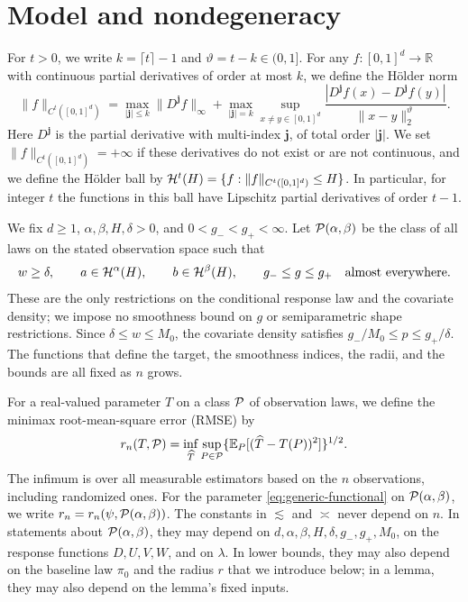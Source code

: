 \section{Model and nondegeneracy}\label{sec:exactclass}

For $t>0$, we write $k=\lceil t\rceil-1$ and $\vartheta=t-k\in(0,1]$.
For any $f:[0,1]^d\to\mathbb R$ with continuous partial derivatives
of order at most $k$, we define the H\"older norm
\[
 \|f\|_{C^t([0,1]^d)}
 =\max_{|\mathbf j|\le k}\|D^{\mathbf j} f\|_\infty
 +\max_{|\mathbf j|=k}\sup_{x\ne y\in[0,1]^d}
 \frac{|D^{\mathbf j} f(x)-D^{\mathbf j} f(y)|}{\|x-y\|_2^\vartheta}.
\]
Here $D^{\mathbf j}$ is the partial derivative with multi-index
$\mathbf j$, of total order $|\mathbf j|$.
We set $\|f\|_{C^t([0,1]^d)}=+\infty$ if these derivatives do not
exist or are not continuous, and we define the H\"older ball by
$\mathcal H^t(H)=\{f:\|f\|_{C^t([0,1]^d)}\le H\}$.
In particular, for integer $t$ the functions in this ball have Lipschitz
partial derivatives of order $t-1$.

We fix $d\ge1$, $\alpha,\beta,H,\delta>0$, and $0<g_-<g_+<\infty$.
Let $\mathcal P(\alpha,\beta)$ be the class of all laws on the stated
observation space such that
\begin{equation}\label{eq:generic-class}
 w\ge\delta,\qquad
 a\in\mathcal H^\alpha(H),\qquad b\in\mathcal H^\beta(H),\qquad
 g_-\le g\le g_+\quad\text{almost everywhere}.
\end{equation}
These are the only restrictions on the conditional response law
and the covariate density; we impose no smoothness bound on $g$ or
semiparametric shape restrictions. Since $\delta\le w\le M_0$, the covariate density
satisfies $g_-/M_0\le p\le g_+/\delta$. The functions that define the
target, the smoothness indices, the radii, and the bounds are all fixed
as $n$ grows.

For a real-valued parameter $T$ on a class $\mathcal P$ of observation laws,
we define the minimax root-mean-square error (RMSE) by
\[
 r_n(T,\mathcal P)=\inf_{\widehat T}\sup_{P\in\mathcal P}
 \{\mathbb E_P[(\widehat T-T(P))^2]\}^{1/2}.
\]
The infimum is over all measurable estimators based on the $n$
observations, including randomized ones.
For the parameter \eqref{eq:generic-functional} on
$\mathcal P(\alpha,\beta)$, we write $r_n=r_n(\psi,\mathcal P(\alpha,\beta))$.
The constants in $\lesssim$ and $\asymp$ never depend on $n$. In
statements about $\mathcal P(\alpha,\beta)$, they may depend on
$d,\alpha,\beta,H,\delta,g_-,g_+,M_0$, on the response functions
$D,U,V,W$, and on $\lambda$. In lower bounds, they may also depend on
the baseline law $\pi_0$ and the radius $r$ that we introduce below; in
a lemma, they may also depend on the lemma's fixed inputs.

